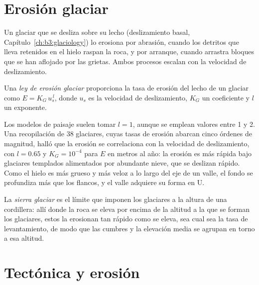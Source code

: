 \section{Erosión glaciar}\label{sec:b3:quantitative-geomorphology:glacial}

Un glaciar que se desliza sobre su lecho (deslizamiento basal,
Capítulo~\ref{ch:b3:glaciology}) lo erosiona por abrasión, cuando los detritos que lleva retenidos en
el hielo raspan la roca, y por arranque, cuando arrastra bloques que se han aflojado por
las grietas. Ambos procesos escalan con la velocidad de deslizamiento.

\begin{definition}\label{def:b3:quantitative-geomorphology:glacial}
Una \emph{ley de erosión glaciar} proporciona la tasa de
erosión del lecho de un glaciar como $E = K_G\,u_s^{\,l}$, donde $u_s$ es la
velocidad de deslizamiento, $K_G$ un coeficiente y $l$ un exponente.
\end{definition}

Los modelos de paisaje suelen tomar $l = 1$, aunque se emplean valores entre 1 y 2.
Una recopilación de 38 glaciares, cuyas tasas de erosión abarcan cinco órdenes de
magnitud, halló que la erosión se correlaciona con la velocidad de deslizamiento, con $l = 0.65$ y
$K_G = 10^{-4}$ para $E$ en metros al año: la erosión es más rápida bajo glaciares templados
alimentados por abundante nieve, que se deslizan rápido. Como el hielo es más grueso
y más veloz a lo largo del eje de un valle, el fondo se profundiza más que
los flancos, y el valle adquiere su forma en U.

\begin{definition}\label{def:b3:quantitative-geomorphology:buzzsaw}
La \emph{sierra glaciar} es el límite que imponen los glaciares a la
altura de una cordillera: allí donde la roca se eleva por encima de la altitud
a la que se forman los glaciares, estos la erosionan tan rápido como se eleva, sea cual sea
la tasa de levantamiento, de modo que las cumbres y la elevación media se agrupan en torno a esa altitud.
\end{definition}

\section{Tectónica y erosión}\label{sec:b3:quantitative-geomorphology:tectonics}

